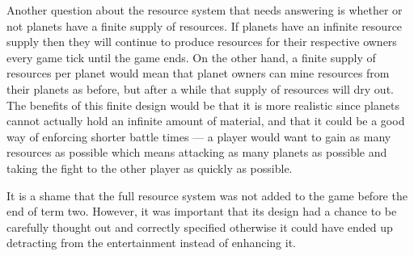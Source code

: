 
Another question about the resource system that needs answering is whether or not planets have a finite supply of resources. If planets have an infinite resource supply then they will continue to produce resources for their respective owners every game tick until the game ends. On the other hand, a finite supply of resources per planet would mean that planet owners can mine resources from their planets as before, but after a while that supply of resources will dry out. The benefits of this finite design would be that it is more realistic since planets cannot actually hold an infinite amount of material, and that it could be a good way of enforcing shorter battle times --- a player would want to gain as many resources as possible which means attacking as many planets as possible and taking the fight to the other player as quickly as possible.

It is a shame that the full resource system was not added to the game before the end of term two. However, it was important that its design had a chance to be carefully thought out and correctly specified otherwise it could have ended up detracting from the entertainment instead of enhancing it.
